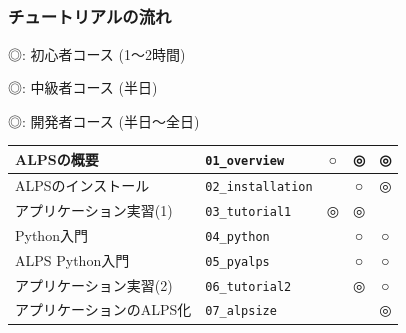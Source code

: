 \subsection*{\redb\whiteb\greenb}
\begin{frame}[t,fragile]
  \frametitle{チュートリアルの流れ}
             {\footnotesize\color{red} ◎}: 初心者コース (1〜2時間)

             {\footnotesize\color{blue} ◎}: 中級者コース (半日)

             {\footnotesize\color{green} ◎}: 開発者コース (半日〜全日) \\[1em]
             
  \begin{tabular}{|l|l|c|c|c|}
        \hline
        ALPSの概要 & {\tt 01\_overview} & {\footnotesize\color{red} ○} & {\footnotesize\color{blue} ◎} & {\footnotesize\color{green} ◎} \\
        \hline
        ALPSのインストール & {\tt 02\_installation} & {\footnotesize\color{red} } & {\footnotesize\color{blue} ○} & {\footnotesize\color{green} ◎} \\
        \hline
        アプリケーション実習(1) & {\tt 03\_tutorial1} & {\footnotesize\color{red} ◎} & {\footnotesize\color{blue} ◎} & {\footnotesize\color{green} } \\
        \hline
        Python入門 & {\tt 04\_python} & {\footnotesize\color{red}} & {\footnotesize\color{blue} ○} & {\footnotesize\color{green} ○} \\
        \hline
        ALPS Python入門 & {\tt 05\_pyalps} & {\footnotesize\color{red} } & {\footnotesize\color{blue} ○} & {\footnotesize\color{green} ○} \\
        \hline
        アプリケーション実習(2) & {\tt 06\_tutorial2} & {\footnotesize\color{red} } & {\footnotesize\color{blue} ◎} & {\footnotesize\color{green} ○} \\
        \hline
        アプリケーションのALPS化 & {\tt 07\_alpsize} & {\footnotesize\color{red} } & {\footnotesize\color{blue} } & {\footnotesize\color{green} ◎} \\
        \hline
  \end{tabular}
\end{frame}

